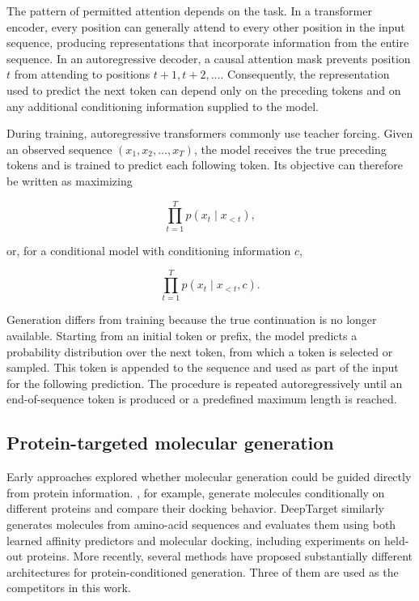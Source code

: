 \documentclass[a4paper,12pt]{article}
\begin{document}
The pattern of permitted attention depends on the task. In a transformer encoder, every position can generally attend to every other position in the input sequence, producing representations that incorporate information from the entire sequence. In an autoregressive decoder, a causal attention mask prevents position $t$ from attending to positions $t+1,t+2,\ldots$. Consequently, the representation used to predict the next token can depend only on the preceding tokens and on any additional conditioning information supplied to the model.

During training, autoregressive transformers commonly use teacher forcing. Given an observed sequence $(x_1,x_2,\ldots,x_T)$, the model receives the true preceding tokens and is trained to predict each following token. Its objective can therefore be written as maximizing

\begin{equation*}
    \prod_{t=1}^{T}
    p(x_t\mid x_{<t}),
\end{equation*}

\noindent or, for a conditional model with conditioning information $c$,

\begin{equation*}
    \prod_{t=1}^{T}
    p(x_t\mid x_{<t},c).
\end{equation*}

Generation differs from training because the true continuation is no longer available. Starting from an initial token or prefix, the model predicts a probability distribution over the next token, from which a token is selected or sampled. This token is appended to the sequence and used as part of the input for the following prediction. The procedure is repeated autoregressively until an end-of-sequence token is produced or a predefined maximum length is reached.

\subsection{Protein-targeted molecular generation}
\label{sec:protein_targeted_generation}
Early approaches explored whether molecular generation could be guided directly
from protein information. \textcite{Uludogan_Ozkirimli_Ulgen_2022}, for
example, generate molecules conditionally on different proteins and compare
their docking behavior. DeepTarget \parencite{Chen_Wang_Wang_2023} similarly
generates molecules from amino-acid sequences and evaluates them using both
learned affinity predictors and molecular docking, including experiments on
held-out proteins. More recently, several methods have proposed substantially different
architectures for protein-conditioned generation. Three of them are used as
the competitors in this work.
\end{document}
